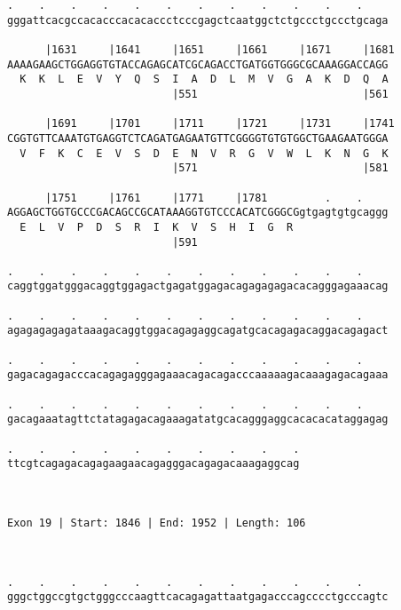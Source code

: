 \documentclass{article}
\begin{document}
\begin{Verbatim}
.    .    .    .    .    .    .    .    .    .    .    .    
gggattcacgccacacccacacaccctcccgagctcaatggctctgccctgccctgcaga
                                                            
      |1631     |1641     |1651     |1661     |1671     |1681
AAAAGAAGCTGGAGGTGTACCAGAGCATCGCAGACCTGATGGTGGGCGCAAAGGACCAGG
  K  K  L  E  V  Y  Q  S  I  A  D  L  M  V  G  A  K  D  Q  A
                          |551                          |561
  
      |1691     |1701     |1711     |1721     |1731     |1741
CGGTGTTCAAATGTGAGGTCTCAGATGAGAATGTTCGGGGTGTGTGGCTGAAGAATGGGA
  V  F  K  C  E  V  S  D  E  N  V  R  G  V  W  L  K  N  G  K
                          |571                          |581
  
      |1751     |1761     |1771     |1781         .    .    
AGGAGCTGGTGCCCGACAGCCGCATAAAGGTGTCCCACATCGGGCGgtgagtgtgcaggg
  E  L  V  P  D  S  R  I  K  V  S  H  I  G  R               
                          |591                              
  
.    .    .    .    .    .    .    .    .    .    .    .    
caggtggatgggacaggtggagactgagatggagacagagagagacacagggagaaacag
                                                            
.    .    .    .    .    .    .    .    .    .    .    .    
agagagagagataaagacaggtggacagagaggcagatgcacagagacaggacagagact
                                                            
.    .    .    .    .    .    .    .    .    .    .    .    
gagacagagacccacagagagggagaaacagacagacccaaaaagacaaagagacagaaa
                                                            
.    .    .    .    .    .    .    .    .    .    .    .    
gacagaaatagttctatagagacagaaagatatgcacagggaggcacacacataggagag
                                                            
.    .    .    .    .    .    .    .    .    .
ttcgtcagagacagagaagaacagagggacagagacaaagaggcag
                                              
                                              
 
Exon 19 | Start: 1846 | End: 1952 | Length: 106



.    .    .    .    .    .    .    .    .    .    .    .    
gggctggccgtgctgggcccaagttcacagagattaatgagacccagcccctgcccagtc
                                                            

\end{Verbatim}
\end{document}
